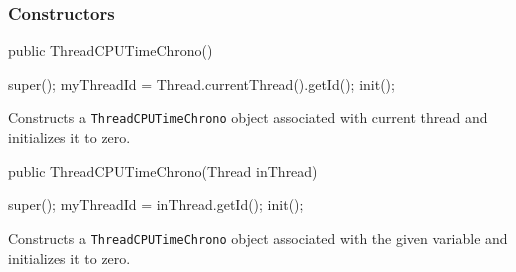 \subsubsection*{Constructors}

\begin{code}

   public ThreadCPUTimeChrono()\begin{hide} {
      super();
      myThreadId = Thread.currentThread().getId();
      init();
   }\end{hide}
\end{code}
  \begin{tabb} Constructs a \texttt{ThreadCPUTimeChrono} object associated 
  with current thread and initializes it to zero.
  \end{tabb}
\begin{code}

   public ThreadCPUTimeChrono(Thread inThread)\begin{hide} {
      super();
      myThreadId = inThread.getId();
      init();
   }\end{hide}
\end{code}
  \begin{tabb} Constructs a \texttt{ThreadCPUTimeChrono} object associated 
  with the given  variable and initializes it to zero.
  \end{tabb}
\begin{code}
\begin{hide}
}\end{hide}
\end{code}
